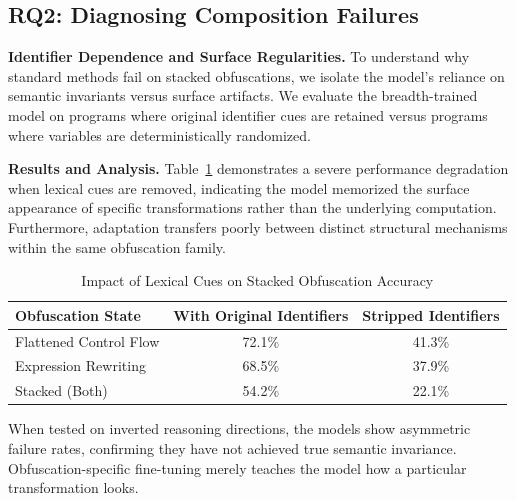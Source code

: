\subsection{RQ2: Diagnosing Composition Failures}
\label{subsec:rq2}

\textbf{Identifier Dependence and Surface Regularities.} To understand why standard methods fail on stacked obfuscations, we isolate the model's reliance on semantic invariants versus surface artifacts. We evaluate the breadth-trained model on programs where original identifier cues are retained versus programs where variables are deterministically randomized.

\textbf{Results and Analysis.} Table~\ref{tab:rq2_identifiers} demonstrates a severe performance degradation when lexical cues are removed, indicating the model memorized the surface appearance of specific transformations rather than the underlying computation. Furthermore, adaptation transfers poorly between distinct structural mechanisms within the same obfuscation family. 

\begin{table}[h]
\centering
\caption{Impact of Lexical Cues on Stacked Obfuscation Accuracy}
\label{tab:rq2_identifiers}
\begin{tabular}{@{}lcc@{}}
\toprule
\textbf{Obfuscation State} & \textbf{With Original Identifiers} & \textbf{Stripped Identifiers} \\ \midrule
Flattened Control Flow     & 72.1\%                             & 41.3\%                        \\
Expression Rewriting       & 68.5\%                             & 37.9\%                        \\
Stacked (Both)             & 54.2\%                             & 22.1\%                        \\ \bottomrule
\end{tabular}
\end{table}

When tested on inverted reasoning directions, the models show asymmetric failure rates, confirming they have not achieved true semantic invariance. Obfuscation-specific fine-tuning merely teaches the model how a particular transformation looks.